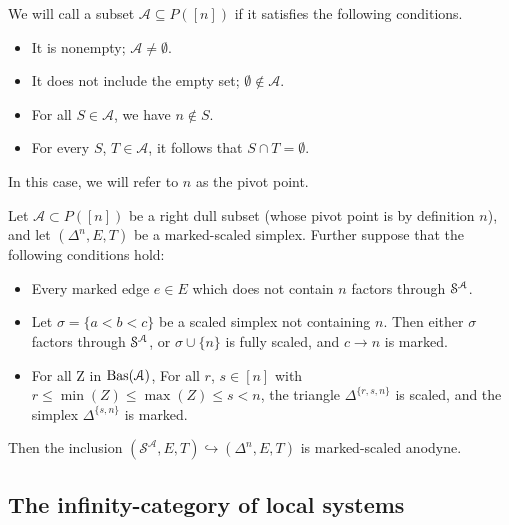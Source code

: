 \documentclass[main.tex]{subfiles}
\begin{document}
\begin{definition}
  We will call a subset $\mathcal{A} \subseteq P([n])$  if it satisfies the following conditions.
  \begin{itemize}
    \item It is nonempty; $\mathcal{A} \neq \emptyset$.

    \item It does not include the empty set; $\emptyset \notin \mathcal{A}$.

    \item For all $S \in \mathcal{A}$, we have $n \notin S$.

    \item For every $S$, $T \in \mathcal{A}$, it follows that $S \cap T = \emptyset$.
  \end{itemize}

  In this case, we will refer to $n$ as the pivot point.
\end{definition}

\begin{lemma}
  \label{lemma:right-anodyne_pivot_trick}
  Let $\mathcal{A} \subset P([n])$ be a right dull subset (whose pivot point is by definition $n$), and let $(\Delta^{n}, E, T)$ be a marked-scaled simplex. Further suppose that the following conditions hold:
  \begin{itemize}
    \item Every marked edge $e \in E$ which does not contain $n$ factors through $\S^{\mathcal{A}}$.

    \item Let $\sigma = \{a < b < c\}$ be a scaled simplex not containing $n$. Then either $\sigma$ factors through $\S^{\mathcal{A}}$, or $\sigma \cup \{n\}$ is fully scaled, and $c \to n$ is marked.

    \item For all Z in  $\Bas(\category{A})$, For all $r$, $s \in [n]$ with $r \leq \min(Z) \leq \max(Z) \leq s < n$, the triangle $\Delta^{\{r, s, n\}}$ is scaled, and the simplex $\Delta^{\{s, n\}}$ is marked.
  \end{itemize}

  Then the inclusion $(\mathcal{S}^{\mathcal{A}}, E, T) \hookrightarrow (\Delta^{n}, E, T)$ is marked-scaled anodyne.
\end{lemma}

\subsection{The infinity-category of local systems}
\label{ssc:the_infinity_category_of_local_systems}
\end{document}
